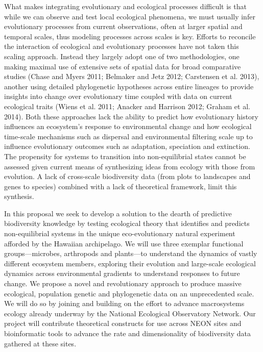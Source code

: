 \documentclass[11pt]{article}
\begin{document}
What makes integrating evolutionary and ecological processes difficult is that while we can observe and test local ecological phenomena, we must usually infer evolutionary processes from current observations, often at larger spatial and temporal scales, thus modeling processes across scales is key. Efforts to reconcile the interaction of ecological and evolutionary processes have not taken this scaling approach.  Instead they largely adopt one of two methodologies, one making maximal use of extensive sets of spatial data for broad comparative studies (Chase and Myers 2011; Belmaker and Jetz 2012; Carstensen et al. 2013), another using detailed phylogenetic hypotheses across entire lineages to provide insights into change over evolutionary time coupled with data on current ecological traits (Wiens et al. 2011; Anacker and Harrison 2012; Graham et al. 2014). Both these approaches lack the ability to predict how evolutionary history influences an ecosystem’s response to environmental change and how ecological time-scale mechanisms such as dispersal and environmental filtering scale up to influence evolutionary outcomes such as adaptation, speciation and extinction.  The propensity for systems to transition into non-equilibrial states cannot be assessed given current means of synthesizing ideas from ecology with those from evolution.  A lack of cross-scale biodiversity data (from plots to landscapes and genes to species) combined with a lack of theoretical framework, limit this synthesis.

In this proposal we seek to develop a solution to the dearth of predictive biodiversity knowledge by testing ecological theory that identifies and predicts non-equilibrial systems in the unique eco-evolutionary natural experiment afforded by the Hawaiian archipelago.  We will use three exemplar functional groups---microbes, arthropods and plants---to understand the dynamics of vastly different ecosystem members, exploring their evolution and large-scale ecological dynamics across environmental gradients to understand responses to future change.  We propose a novel and revolutionary approach to produce massive ecological, population genetic and phylogenetic data on an unprecedented scale. We will do so by joining and building on the effort to advance macrosystems ecology already underway by the National Ecological Observatory Network.  Our project will contribute theoretical constructs for use across NEON sites and bioinformatic tools to advance the rate and dimensionality of biodiversity data gathered at these sites.
\end{document}
